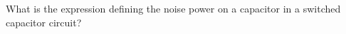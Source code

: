 \subsection{}
What is the expression defining the noise power on a capacitor in a switched capacitor circuit?
